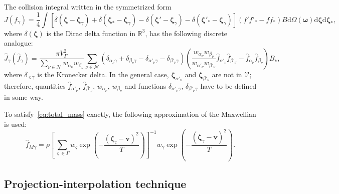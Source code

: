 \documentclass[review]{elsarticle}
\newcommand{\dd}{\mathrm{d}}
\newcommand{\dzeta}{\boldsymbol{\dd\zeta}}
\newcommand{\bzeta}{\boldsymbol{\zeta}}
\newcommand{\Nu}{\mathcal{N}}
\begin{document}
The collision integral written in the symmetrized form
\begin{equation}\label{eq:symm_ci}
    J(f_\gamma) = \frac14\int \left[
        \delta(\bzeta-\bzeta_\gamma) + \delta(\bzeta_*-\bzeta_\gamma)
        - \delta(\bzeta'-\bzeta_\gamma) - \delta(\bzeta'_*-\bzeta_\gamma)\right]
        (f'f'_* - ff_*)B \dd\Omega(\boldsymbol{\omega}) \dzeta\dzeta_*,
\end{equation}
where \(\delta(\bzeta)\) is the Dirac delta function in \(\mathbb{R}^3\),
has the following discrete analogue:
\begin{equation}\label{eq:discrete_symm_ci}
    \hat{J}_\gamma(\hat{f}_\gamma) =
        \frac{\pi V_\Gamma^2}{\sum_{\nu\in\Nu} w_{\alpha_\nu}w_{\beta_\nu}}
        \sum_{\nu\in\Nu} \left(
            \delta_{\alpha_\nu\gamma} + \delta_{\beta_\nu\gamma}
            - \delta_{\alpha'_\nu\gamma} - \delta_{\beta'_\nu\gamma}
        \right)\left(
            \frac{w_{\alpha_\nu}w_{\beta_\nu}}{w_{\alpha'_\nu}w_{\beta'_\nu}}
            \hat{f}_{\alpha'_\nu}\hat{f}_{\beta'_\nu} - \hat{f}_{\alpha_\nu}\hat{f}_{\beta_\nu}
        \right)B_\nu,
\end{equation}
where \(\delta_{\varsigma\gamma}\) is the Kronecker delta.
In the general case, \(\bzeta_{\alpha'_\nu}\) and \(\bzeta_{\beta'_\nu}\) are not in \(\mathcal{V}\);
therefore, quantities \(\hat{f}_{\alpha'_\nu}\), \(\hat{f}_{\beta'_\nu}\), \(w_{\alpha_\nu}\), \(w_{\beta_\nu}\)
and functions \(\delta_{\alpha'_\nu\gamma}\), \(\delta_{\beta'_\nu\gamma}\) have to be defined in some way.

To satisfy~\eqref{eq:total_mass} exactly, the following approximation of the Maxwellian is used:
\begin{equation}\label{eq:discrete_Maxwellian}
    \hat{f}_{M\gamma} = \rho\left[\sum_{\varsigma\in\Gamma}w_\varsigma\exp
            \left(-\frac{(\bzeta_\varsigma - \boldsymbol{v})^2}{T}\right)
        \right]^{-1}
        w_\gamma\exp\left(-\frac{(\bzeta_\gamma - \boldsymbol{v})^2}{T}\right).
\end{equation}

\subsection{Projection-interpolation technique}
\end{document}
